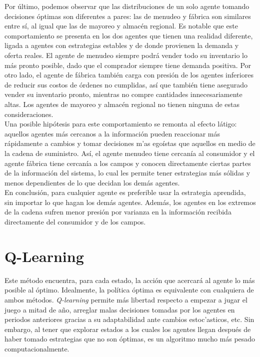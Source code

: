 Por \'ultimo, podemos observar que las distribuciones de un solo agente tomando decisiones \'optimas son diferentes a pares: las de menudeo y f\'abrica son similares entre s\'i, al igual que las de mayoreo y almac\'en regional. Es notable que este comportamiento se presenta en los dos agentes que tienen una realidad diferente, ligada a agentes con estrategias estables y de donde provienen la demanda y oferta reales. El agente de menudeo siempre podr\'a vender todo su inventario lo m\'as pronto posible, dado que el comprador siempre tiene demanda positiva. Por otro lado, el agente de f\'abrica tambi\'en carga con presi\'on de los agentes inferiores de reducir sus costos de \'ordenes no cumplidas, as\'i que tambi\'en tiene asegurado vender su inventario pronto, mientras no compre cantidades innecesariamente altas. Los agentes de mayoreo y almac\'en regional no tienen ninguna de estas consideraciones.\\

Una posible hip\'otesis para este comportamiento se remonta al efecto l\'atigo: aquellos agentes m\'as cercanos a la informaci\'on pueden reaccionar m\'as r\'apidamente a cambios y tomar decisiones m'as ego\'istas que aquellos en medio de la cadena de suministro. As\'i, el agente menudeo tiene cercan\'ia al consumidor y el agente f\'abrica tiene cercan\'ia a los campos y conocen directamente ciertas partes de la informaci\'on del sistema, lo cual les permite tener estrategias m\'as s\'olidas y menos dependientes de lo que decidan los dem\'as agentes.\\

En conclusi\'on, para cualquier agente es preferible usar la estrategia aprendida, sin importar lo que hagan los dem\'as agentes. Adem\'as, los agentes en los extremos de la cadena sufren menor presi\'on por varianza en la informaci\'on recibida directamente del consumidor y de los campos.\\



\section{Q-Learning}

Este m\'etodo encuentra, para cada estado, la acci\'on que acercar\'a al agente lo m\'as posible al \'optimo. Idealmente, la pol\'itica \'optima es equivalente con cualquiera de ambos m\'etodos. \textit{Q-learning} permite m\'as libertad respecto a empezar a jugar el juego a mitad de a\~no, arreglar malas decisiones tomadas por los agentes en periodos anteriores gracias a su adaptabilidad ante cambios estoc'asticos, etc. Sin embargo, al tener que explorar estados a los cuales los agentes llegan despu\'es de haber tomado estrategias que no son \'optimas, es un algoritmo mucho m\'as pesado computacionalmente.\\

